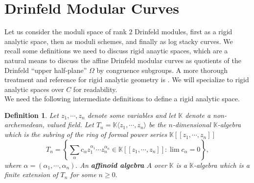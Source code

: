 \documentclass[11pt]{amsart}
\newtheorem{definition}[theorem]{Definition}
\newtheorem{example}[theorem]{Example}
\theoremstyle{definition}
\numberwithin{equation}{section}
\newcommand{\GL}{\mathrm{GL}} 	%
\newcommand{\bbA}{\mathbb{A}}		%
\newcommand{\bbK}{\mathbb{K}}		%
\begin{document}
		\section{Drinfeld Modular Curves}
		
		Let us consider the moduli space of rank $2$ Drinfeld modules, first as a rigid analytic space, then as moduli schemes, and finally as log stacky curves. We recall some definitions we need to discuss rigid anaytic spaces, which are a natural means to discuss the affine Drinfeld modular curves as quotients of the Drinfeld ``upper half-plane'' $\Omega$ by congruence subgroups. A more thorough treatment and reference for rigid analytic geometry is \cite{Frensel-vanderPut-Rigid-Analytic_Geom}. We will specialize to rigid analytic spaces over $C$ for readability.\\
		
		We need the following intermediate definitions to define a rigid analytic space. 
		\begin{definition}%
			Let $z_1,\cdots, z_n$ denote some variables and let $\bbK$ denote a non-archemedean, valued field. Let $T_n=\bbK\langle z_1,\cdots, z_n\rangle$ be the $n$-dimensional $\bbK$-algebra which is the subring of the ring of formal power series $\bbK[\![z_1,\cdots, z_n]\!]$ 
			\[T_n=\left\{\sum_{\alpha} c_{\alpha}z_1^{\alpha_1}\cdots z_n^{\alpha_n}\in \bbK[\![z_1,\cdots, z_n]\!] :\lim c_{\alpha}=0\right\},\] 
			where $\alpha = (\alpha_1,\cdots,\alpha_n).$ An \textbf{affinoid algebra} $A$ over $\bbK$ is a $\bbK$-algebra which is a finite extension of $T_n$ for some $n\geq 0.$
		\end{definition} 
		
\end{document}
